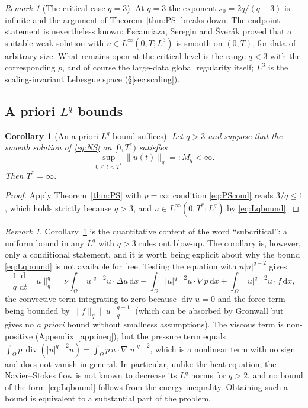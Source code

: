 \documentclass[11pt]{article}
\newtheorem{corollary}[theorem]{Corollary}
\theoremstyle{remark}
\newtheorem{remark}[theorem]{Remark}
\newcommand{\dd}{\,\mathrm{d}}
\newcommand{\norm}[1]{\lVert #1\rVert}
\newcommand{\abs}[1]{\lvert #1\rvert}
\newcommand{\Div}{\operatorname{div}}
\begin{document}
\begin{remark}[The critical case $q=3$]\label{rem:q3}
At $q=3$ the exponent $s_0=2q/(q-3)$ is infinite and the argument of
Theorem~\ref{thm:PS} breaks down. The endpoint statement is nevertheless known:
Escauriaza, Seregin and \v{S}ver\'ak \cite{ESS2003} proved that a suitable weak solution
with $u\in L^\infty(0,T;L^3)$ is smooth on $(0,T)$, for data of arbitrary size. What remains
open at the critical level is the range $q<3$ with the corresponding $p$, and of course the
large-data global regularity itself; $L^3$ is the scaling-invariant Lebesgue space
(\S\ref{sec:scaling}).
\end{remark}

\subsection{A priori $L^q$ bounds}

\begin{corollary}[An a priori $L^q$ bound suffices]\label{cor:subcritical}
Let $q>3$ and suppose that the smooth solution of \eqref{eq:NS} on $[0,T^*)$ satisfies
\begin{equation}\label{eq:Lqbound}
\sup_{0\le t<T^*}\norm{u(t)}_{q}=:M_q<\infty .
\end{equation}
Then $T^*=\infty$.
\end{corollary}

\begin{proof}
Apply Theorem~\ref{thm:PS} with $p=\infty$: condition \eqref{eq:PScond} reads $3/q\le1$,
which holds strictly because $q>3$, and $u\in L^\infty(0,T^*;L^q)$ by \eqref{eq:Lqbound}.
\end{proof}

\begin{remark}\label{rem:subcritical}
Corollary~\ref{cor:subcritical} is the quantitative content of the word ``subcritical'': a
uniform bound in any $L^q$ with $q>3$ rules out blow-up. The corollary is, however, only a
conditional statement, and it is worth being explicit about why the bound \eqref{eq:Lqbound}
is not available for free. Testing the equation with $u\abs{u}^{q-2}$ gives
\[
\frac1q\frac{\dd}{\dd t}\norm{u}_{q}^{q}
=\nu\int_\Omega\abs{u}^{q-2}u\cdot\Delta u\dd x
-\int_\Omega\abs{u}^{q-2}u\cdot\nabla p\dd x
+\int_\Omega\abs{u}^{q-2}u\cdot f\dd x ,
\]
the convective term integrating to zero because $\Div u=0$ and the force term being bounded
by $\norm{f}_{q}\norm{u}_{q}^{q-1}$ (which can be absorbed by Gronwall but gives no
\emph{a priori} bound without smallness assumptions). The viscous term is non-positive
(Appendix~\ref{app:ineq}), but the pressure term equals
$\int_\Omega p\,\Div(\abs{u}^{q-2}u)=\int_\Omega p\,u\cdot\nabla\abs{u}^{q-2}$, which is a
nonlinear term with no sign and does not vanish in general. In particular, unlike the heat equation, the
Navier--Stokes flow is not known to decrease its $L^q$ norms for $q>2$, and no bound of the
form \eqref{eq:Lqbound} follows from the energy inequality. Obtaining such a bound is
equivalent to a substantial part of the problem.
\end{remark}
\end{document}
